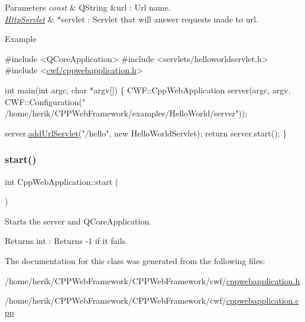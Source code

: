 \begin{DoxyParams}{Parameters}
{\em const} & Q\+String \&url \+: Url name. \\
\hline
{\em \hyperlink{class_http_servlet}{Http\+Servlet}} & $\ast$servlet \+: Servlet that will answer requests made to url. \\
\hline
\end{DoxyParams}
\begin{DoxyParagraph}{Example}

\begin{DoxyCode}
\textcolor{preprocessor}{#include <QCoreApplication>}
\textcolor{preprocessor}{#include <servlets/helloworldservlet.h>}
\textcolor{preprocessor}{#include <\hyperlink{cppwebapplication_8h}{cwf/cppwebapplication.h}>}

\textcolor{keywordtype}{int} main(\textcolor{keywordtype}{int} argc, \textcolor{keywordtype}{char} *argv[])
\{
     CWF::CppWebApplication server(argc, argv, CWF::Configuration(\textcolor{stringliteral}{"
      /home/herik/CPPWebFramework/examples/HelloWorld/server"}));

     server.\hyperlink{class_cpp_web_server_ae94dcf116776b97ec7d5a00cde87c6bd}{addUrlServlet}(\textcolor{stringliteral}{"/hello"}, \textcolor{keyword}{new} HelloWorldServlet);
     \textcolor{keywordflow}{return} server.start();
\}
\end{DoxyCode}
 
\end{DoxyParagraph}
\mbox{\label{class_cpp_web_application_a1e9f2c789934748d6b7c29ad33e9d7c9}} 
\subsubsection{\texorpdfstring{start()}{start()}}
{\footnotesize\ttfamily int Cpp\+Web\+Application\+::start (\begin{DoxyParamCaption}{ }\end{DoxyParamCaption})}



Starts the server and Q\+Core\+Application. 

\begin{DoxyReturn}{Returns}
int \+: Returns -\/1 if it fails. 
\end{DoxyReturn}


The documentation for this class was generated from the following files\+:\begin{DoxyCompactItemize}
\item 
/home/herik/\+C\+P\+P\+Web\+Framework/\+C\+P\+P\+Web\+Framework/cwf/\hyperlink{cppwebapplication_8h}{cppwebapplication.\+h}\item 
/home/herik/\+C\+P\+P\+Web\+Framework/\+C\+P\+P\+Web\+Framework/cwf/\hyperlink{cppwebapplication_8cpp}{cppwebapplication.\+cpp}\end{DoxyCompactItemize}
